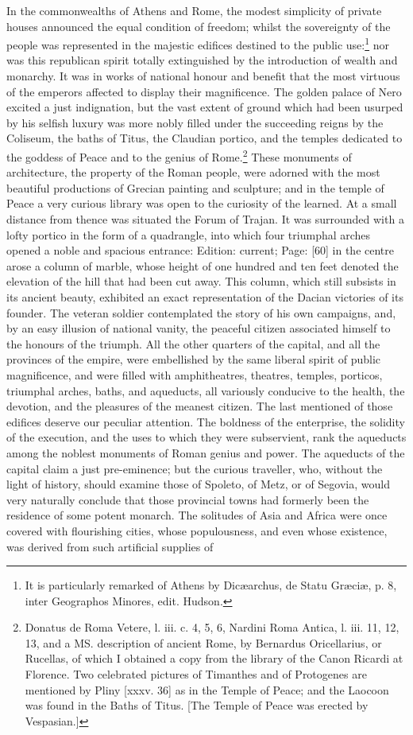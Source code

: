 In the commonwealths of Athens and Rome, the modest simplicity of private houses announced the equal condition of freedom; whilst the sovereignty of the people was represented in the majestic edifices destined to the public use:\footnote{It is particularly remarked of Athens by Dicæarchus, de Statu Græciæ, p. 8, inter Geographos Minores, edit. Hudson.} nor was this republican spirit totally extinguished by the introduction of wealth and monarchy. It was in works of national honour and benefit that the most virtuous of the emperors affected to display their magnificence. The golden palace of Nero excited a just indignation, but the vast extent of ground which had been usurped by his selfish luxury was more nobly filled under the succeeding reigns by the Coliseum, the baths of Titus, the Claudian portico, and the temples dedicated to the goddess of Peace and to the genius of Rome.\footnote{Donatus de Roma Vetere, l. iii. c. 4, 5, 6, Nardini Roma Antica, l. iii. 11, 12, 13, and a MS. description of ancient Rome, by Bernardus Oricellarius, or Rucellas, of which I obtained a copy from the library of the Canon Ricardi at Florence. Two celebrated pictures of Timanthes and of Protogenes are mentioned by Pliny [xxxv. 36] as in the Temple of Peace; and the Laocoon was found in the Baths of Titus. [The Temple of Peace was erected by Vespasian.]} These monuments of architecture, the property of the Roman people, were adorned with the most beautiful productions of Grecian painting and sculpture; and in the temple of Peace a very curious library was open to the curiosity of the learned. At a small distance from thence was situated the Forum of Trajan. It was surrounded with a lofty portico in the form of a quadrangle, into which four triumphal arches opened a noble and spacious entrance: Edition: current; Page: [60] in the centre arose a column of marble, whose height of one hundred and ten feet denoted the elevation of the hill that had been cut away. This column, which still subsists in its ancient beauty, exhibited an exact representation of the Dacian victories of its founder. The veteran soldier contemplated the story of his own campaigns, and, by an easy illusion of national vanity, the peaceful citizen associated himself to the honours of the triumph. All the other quarters of the capital, and all the provinces of the empire, were embellished by the same liberal spirit of public magnificence, and were filled with amphitheatres, theatres, temples, porticos, triumphal arches, baths, and aqueducts, all variously conducive to the health, the devotion, and the pleasures of the meanest citizen. The last mentioned of those edifices deserve our peculiar attention. The boldness of the enterprise, the solidity of the execution, and the uses to which they were subservient, rank the aqueducts among the noblest monuments of Roman genius and power. The aqueducts of the capital claim a just pre-eminence; but the curious traveller, who, without the light of history, should examine those of Spoleto, of Metz, or of Segovia, would very naturally conclude that those provincial towns had formerly been the residence of some potent monarch. The solitudes of Asia and Africa were once covered with flourishing cities, whose populousness, and even whose existence, was derived from such artificial supplies of 